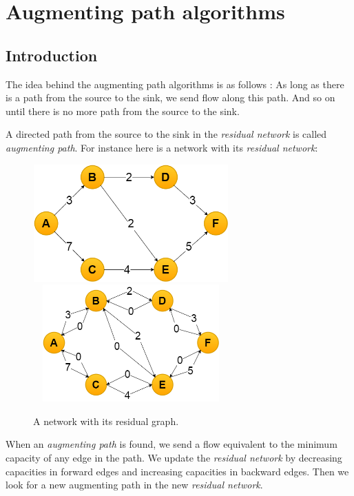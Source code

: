 \section{Augmenting path algorithms}
\subsection{Introduction}
The idea behind the augmenting path algorithms is as follows : 
As long as there is a path from the source to the sink, we send flow along this path. And so on until there is no more path from the source to the sink. \newline

A directed path from the source to the sink in the \textit{residual network} is called \textit{augmenting path}. For instance here is a network with its \textit{residual network}: \newline

\begin{figure}[!h]
\includegraphics[width=7.5cm,height=4.5cm]{images/graph.png}\hfill
\includegraphics[width=7.5cm,height=4.5cm]{images/residualgraph.png}
\caption{A network with its residual graph.}
\end{figure}


When an \textit{augmenting path} is found, we send a flow equivalent to the minimum capacity of any edge in the path. We update the \textit{residual network} by decreasing capacities in forward edges and increasing capacities in backward edges. Then we look for a new augmenting path in the new \textit{residual network}. \newline

